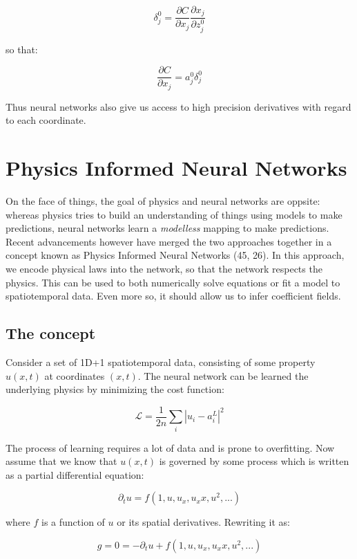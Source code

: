 \documentclass[12pt,a4paper,]{Dissertate}
\begin{document}
\[
\delta^0_j = \frac{\partial C}{\partial x_j}\frac{\partial x_j}{\partial z^0_j}
\]

so that:

\[
\frac{\partial C}{\partial x_j} = a^0_j \delta^0_j 
\]

Thus neural networks also give us access to high precision derivatives
with regard to each coordinate.

\hypertarget{physics-informed-neural-networks-1}{%
\section{Physics Informed Neural
Networks}\label{physics-informed-neural-networks-1}}

On the face of things, the goal of physics and neural networks are
oppsite: whereas physics tries to build an understanding of things using
models to make predictions, neural networks learn a \emph{modelless}
mapping to make predictions. Recent advancements however have merged the
two approaches together in a concept known as Physics Informed Neural
Networks (45, 26). In this approach, we encode physical laws into the
network, so that the network respects the physics. This can be used to
both numerically solve equations or fit a model to spatiotemporal data.
Even more so, it should allow us to infer coefficient fields.

\hypertarget{the-concept-1}{%
\subsection{The concept}\label{the-concept-1}}

Consider a set of 1D+1 spatiotemporal data, consisting of some property
\(u(x,t)\) at coordinates \((x,t)\). The neural network can be learned
the underlying physics by minimizing the cost function:

\[
\mathcal{L} = \frac{1}{2n}\sum_i|u_i-a^L_i|^2
\]

The process of learning requires a lot of data and is prone to
overfitting. Now assume that we know that \(u(x,t)\) is governed by some
process which is written as a partial differential equation:

\[
\partial_t u = f(1, u, u_x, u_xx, u^2, ...)
\]

where \(f\) is a function of \(u\) or its spatial derivatives. Rewriting
it as:

\begin{equation}
g = 0 = -\partial_t u + f(1, u, u_x, u_xx, u^2, ...)
\label{eq:PIcost}\end{equation}
\end{document}
